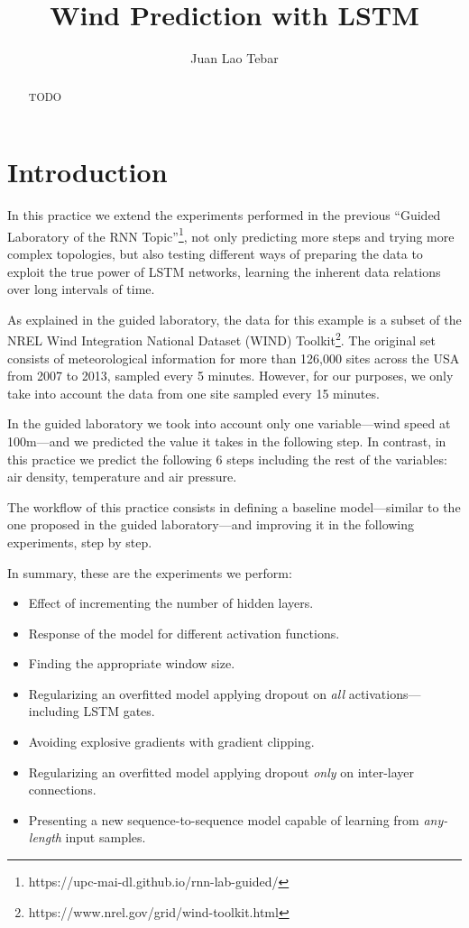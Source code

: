 \documentclass[]{article}
\title{Wind Prediction with LSTM}
\author{Juan Lao Tebar}
\begin{document}
	
\maketitle

\begin{abstract}
	
	TODO
	
\end{abstract}

\section{Introduction}

In this practice we extend the experiments performed in the previous ``Guided Laboratory of the RNN Topic''\footnote{https://upc-mai-dl.github.io/rnn-lab-guided/}, not only predicting more steps and trying more complex topologies, but also testing different ways of preparing the data to exploit the true power of LSTM networks, learning the inherent data relations over long intervals of time.

As explained in the guided laboratory, the data for this example is a subset of the NREL Wind Integration National Dataset (WIND) Toolkit\footnote{https://www.nrel.gov/grid/wind-toolkit.html}. The original set consists of meteorological information for more than 126,000 sites across the USA from 2007 to 2013, sampled every 5 minutes. However, for our purposes, we only take into account the data from one site sampled every 15 minutes.

In the guided laboratory we took into account only one variable---wind speed at 100m---and we predicted the value it takes in the following step. In contrast, in this practice we predict the following 6 steps including the rest of the variables: air density, temperature and air pressure.

The workflow of this practice consists in defining a baseline model---similar to the one proposed in the guided laboratory---and improving it in the following experiments, step by step.

In summary, these are the experiments we perform:

\begin{itemize}
	\item Effect of incrementing the number of hidden layers.
	\item Response of the model for different activation functions.
	\item Finding the appropriate window size.
	\item Regularizing an overfitted model applying dropout on \emph{all} activations---including LSTM gates.
	\item Avoiding explosive gradients with gradient clipping.
	\item Regularizing an overfitted model applying dropout \emph{only} on inter-layer connections.
	\item Presenting a new sequence-to-sequence model capable of learning from \emph{any-length} input samples.
\end{itemize}
\end{document}
